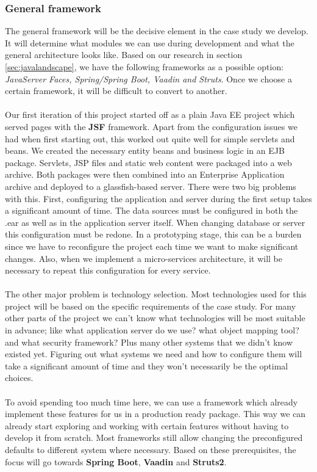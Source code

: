 \documentclass[12pt]{article}
\begin{document}
\begin{multicols}{2}
\subsubsection{General framework}\label{sec:framework}
The general framework will be the decisive element in the case study we develop. It will determine what modules we can use during development and what the general architecture looks like. Based on our research in section \ref{sec:javalandscape}, we have the following frameworks as a possible option: \textit{JavaServer Faces, Spring/Spring Boot, Vaadin and Struts}. Once we choose a certain framework, it will be difficult to convert to another. 
\\\\
Our first iteration of this project started off as a plain Java EE project which served pages with the \textbf{JSF} framework. Apart from the configuration issues we had when first starting out, this worked out quite well for simple servlets and beans. We created the necessary entity beans and business logic in an EJB package. Servlets, JSP files and static web content were packaged into a web archive. Both packages were then combined into an Enterprise Application archive and deployed to a glassfish-based server. There were two big problems with this. First, configuring the application and server during the first setup takes a significant amount of time. The data sources must be configured in both the .ear as well as in the application server itself. When changing database or server this configuration must be redone. In a prototyping stage, this can be a burden since we have to reconfigure the project each time we want to make significant changes. Also, when we implement a micro-services architecture, it will be necessary to repeat this configuration for every service. 
\\\\
The other major problem is technology selection. Most technologies used for this project will be based on the specific requirements of the case study. For many other parts of the project we can't know what technologies will be most suitable in advance; like what application server do we use? what object mapping tool? and what security framework? Plus many other systems that we didn't know existed yet. Figuring out what systems we need and how to configure them will take a significant amount of time and they won't necessarily be the optimal choices. 
\\\\
To avoid spending too much time here, we can use a framework which already implement these features for us in a production ready package. This way we can already start exploring and working with certain features without having to develop it from scratch. Most frameworks still allow changing the preconfigured defaults to different system where necessary. Based on these prerequisites, the focus will go towards \textbf{Spring Boot}, \textbf{Vaadin} and \textbf{Struts2}.

\end{multicols}
\end{document}
